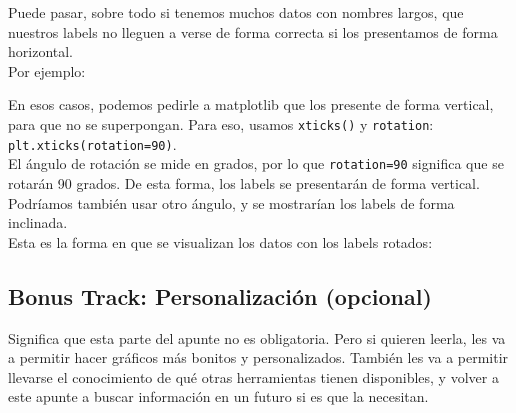 \documentclass[
  letterpaper,
  DIV=11,
  numbers=noendperiod]{scrreprt}
\begin{document}
\begin{tcolorbox}[enhanced jigsaw, opacitybacktitle=0.6, toptitle=1mm, toprule=.15mm, arc=.35mm, breakable, bottomrule=.15mm, opacityback=0, leftrule=.75mm, rightrule=.15mm, title=\textcolor{quarto-callout-note-color}{\faInfo}\hspace{0.5em}{¿Qué pasa si nuestros labels no llegan a verse? (opcional)}, left=2mm, bottomtitle=1mm, colframe=quarto-callout-note-color-frame, colback=white, titlerule=0mm, coltitle=black, colbacktitle=quarto-callout-note-color!10!white]

Puede pasar, sobre todo si tenemos muchos datos con nombres largos, que
nuestros labels no lleguen a verse de forma correcta si los presentamos
de forma horizontal.\\
Por ejemplo:

En esos casos, podemos pedirle a matplotlib que los presente de forma
vertical, para que no se superpongan. Para eso, usamos \texttt{xticks()}
y \texttt{rotation}: \texttt{plt.xticks(rotation=90)}.\\
El ángulo de rotación se mide en grados, por lo que \texttt{rotation=90}
significa que se rotarán 90 grados. De esta forma, los labels se
presentarán de forma vertical. Podríamos también usar otro ángulo, y se
mostrarían los labels de forma inclinada.\\
Esta es la forma en que se visualizan los datos con los labels rotados:

\end{tcolorbox}

\subsection{Bonus Track: Personalización
(opcional)}\label{bonus-track-personalizaciuxf3n-opcional}

\begin{tcolorbox}[enhanced jigsaw, opacitybacktitle=0.6, toptitle=1mm, toprule=.15mm, arc=.35mm, breakable, bottomrule=.15mm, opacityback=0, leftrule=.75mm, rightrule=.15mm, title=\textcolor{quarto-callout-note-color}{\faInfo}\hspace{0.5em}{¿Qué significa opcional?}, left=2mm, bottomtitle=1mm, colframe=quarto-callout-note-color-frame, colback=white, titlerule=0mm, coltitle=black, colbacktitle=quarto-callout-note-color!10!white]

Significa que esta parte del apunte no es obligatoria. Pero si quieren
leerla, les va a permitir hacer gráficos más bonitos y personalizados.
También les va a permitir llevarse el conocimiento de qué otras
herramientas tienen disponibles, y volver a este apunte a buscar
información en un futuro si es que la necesitan.

\end{tcolorbox}
\end{document}
